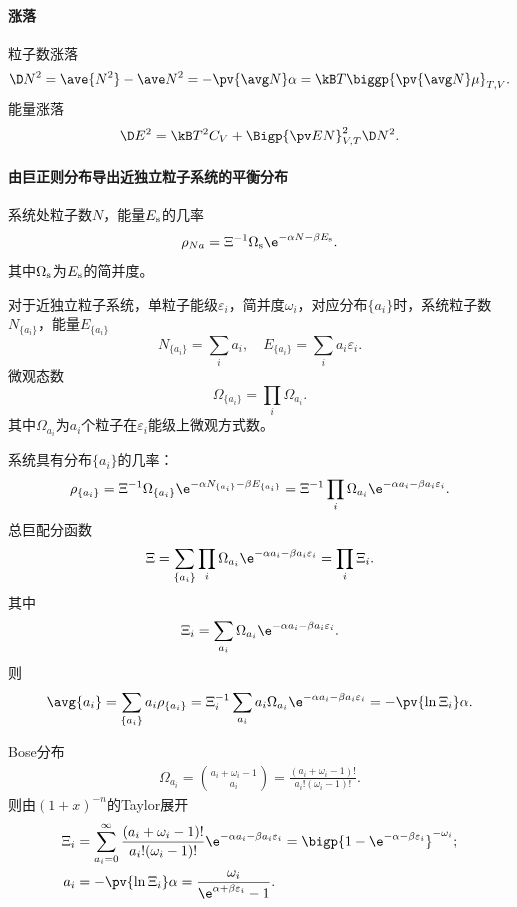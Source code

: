 \paragraph{涨落}
粒子数涨落
\begin{align}
	\D N^2=\ave{N^2}-\ave N^2=-\pv{\avg N}\alpha=\kB T\biggp{\pv{\avg N}\mu}_{T,V}.
\end{align}
能量涨落
\begin{align}
	\D E^2=\kB T^2C_V+\Bigp{\pv EN}_{V,T}^2\D N^2.
\end{align}
\paragraph{由巨正则分布导出近独立粒子系统的平衡分布}系统处粒子数$N$，能量$E_\mathrm s$的几率
\[
	\rho_{Na}=\Xi^{-1}\Omega_\st\e^{-\alpha N-\beta E_\st}.
\]
其中$\Omega_\mathrm s$为$E_\mathrm s$的简并度。

对于近独立粒子系统，单粒子能级$\varepsilon_i$，简并度$\omega_i$，对应分布$\{a_i\}$时，系统粒子数$N_{\{a_i\}}$，能量$E_{\{a_i\}}$
\[
	N_{\{a_i\}}=\sum_ia_i,\quad E_{\{a_i\}}=\sum_ia_i\varepsilon_i.
\]
微观态数
\[
	\Omega_{\{a_i\}}=\prod_i\Omega_{a_i}.
\]
其中$\Omega_{a_i}$为$a_i$个粒子在$\varepsilon_i$能级上微观方式数。

系统具有分布$\{a_i\}$的几率：
\[
	\rho_{\{a_i\}}=\Xi^{-1}\Omega_{\{a_i\}}\e^{-\alpha N_{\{a_i\}}-\beta E_{\{a_i\}}}=\Xi^{-1}\prod_i\Omega_{a_i}\e^{-\alpha{a_i}-\beta{a_i\varepsilon_i}}.
\]
总巨配分函数
\[
	\Xi=\sum_{\{a_i\}}\prod_i\Omega_{a_i}\e^{-\alpha{a_i}-\beta{a_i\varepsilon_i}}=\prod_i\Xi_i.
\]
其中 
\[
	\Xi_i=\sum_{a_i}\Omega_{a_i}\e^{-\alpha{a_i}-\beta{a_i\varepsilon_i}}.
\]
则
\begin{align*}
	\avg{a_i}=\sum_{\{a_i\}}a_i\rho_{\{a_i\}}=\Xi_i^{-1}\sum_{a_i}a_i\Omega_{a_i}\e^{-\alpha{a_i}-\beta{a_i\varepsilon_i}}=-\pv{\ln\Xi_i}\alpha.
\end{align*}

Bose分布
\begin{align}
	\Omega_{a_i}=\binom{a_i+\omega_i-1}{a_i}=\frac{(a_i+\omega_i-1)!}{a_i!(\omega_i-1)!}.
\end{align}
则由$(1+x)^{-n}$的Taylor展开
\begin{align}
	\Xi_i&=\sum_{a_i=0}^\infty\frac{(a_i+\omega_i-1)!}{a_i!(\omega_i-1)!}\e^{-\alpha a_i-\beta a_i\varepsilon_i}=\bigp{1-\e^{-\alpha-\beta\varepsilon_i}}^{-\omega_i};\\
	a_i&=-\pv{\ln\Xi_i}\alpha=\frac{\omega_i}{\e^{\alpha+\beta\varepsilon_i}-1}.
\end{align}

